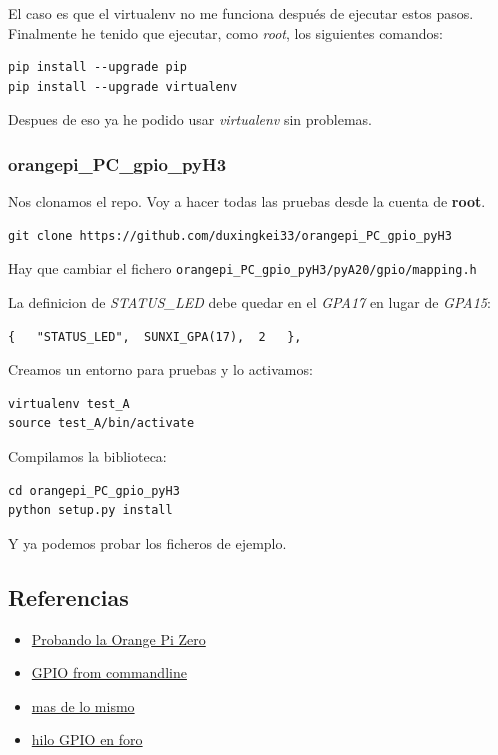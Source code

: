 \documentclass[12pt,spanish,]{scrartcl}
\providecommand{\tightlist}{%
  \setlength{\itemsep}{0pt}\setlength{\parskip}{0pt}}
\begin{document}
El caso es que el virtualenv no me funciona después de ejecutar estos
pasos. Finalmente he tenido que ejecutar, como \emph{root}, los
siguientes comandos:

\begin{verbatim}
pip install --upgrade pip
pip install --upgrade virtualenv
\end{verbatim}

Despues de eso ya he podido usar \emph{virtualenv} sin problemas.

\subsubsection{orangepi\_PC\_gpio\_pyH3}\label{orangepi_pc_gpio_pyh3}

Nos clonamos el repo. Voy a hacer todas las pruebas desde la cuenta de
\textbf{root}.

\begin{verbatim}
git clone https://github.com/duxingkei33/orangepi_PC_gpio_pyH3
\end{verbatim}

Hay que cambiar el fichero
\texttt{orangepi\_PC\_gpio\_pyH3/pyA20/gpio/mapping.h}

La definicion de \emph{STATUS\_LED} debe quedar en el \emph{GPA17} en
lugar de \emph{GPA15}:

\begin{verbatim}
{   "STATUS_LED",  SUNXI_GPA(17),  2   },
\end{verbatim}

Creamos un entorno para pruebas y lo activamos:

\begin{verbatim}
virtualenv test_A
source test_A/bin/activate
\end{verbatim}

Compilamos la biblioteca:

\begin{verbatim}
cd orangepi_PC_gpio_pyH3
python setup.py install
\end{verbatim}

Y ya podemos probar los ficheros de ejemplo.

\subsection{Referencias}\label{referencias}

\begin{itemize}
\tightlist
\item
  \href{http://harald.studiokubota.com/wordpress/index.php/2016/11/19/orange-pi-zero-neat/}{Probando
  la Orange Pi Zero}
\item
  \href{http://falsinsoft.blogspot.com.es/2012/11/access-gpio-from-linux-user-space.html}{GPIO
  from commandline}
\item
  \href{http://www.emcraft.com/stm32f429discovery/controlling-gpio-from-linux-user-space}{mas
  de lo mismo}
\item
  \href{https://forum.armbian.com/index.php/topic/3084-orange-pi-zero-python-gpio-library/}{hilo
  GPIO en foro}
\end{itemize}
\end{document}

